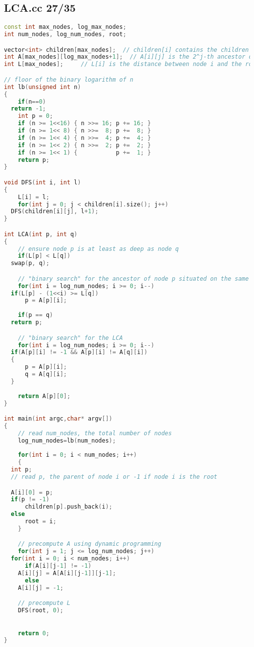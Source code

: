 \subsection{LCA.cc 27/35}
\begin{lstlisting}[language=C++]
const int max_nodes, log_max_nodes;
int num_nodes, log_num_nodes, root;

vector<int> children[max_nodes];  // children[i] contains the children of node i
int A[max_nodes][log_max_nodes+1];  // A[i][j] is the 2^j-th ancestor of node i, or -1 if that ancestor does not exist
int L[max_nodes];     // L[i] is the distance between node i and the root

// floor of the binary logarithm of n
int lb(unsigned int n)
{
    if(n==0)
  return -1;
    int p = 0;
    if (n >= 1<<16) { n >>= 16; p += 16; }
    if (n >= 1<< 8) { n >>=  8; p +=  8; }
    if (n >= 1<< 4) { n >>=  4; p +=  4; }
    if (n >= 1<< 2) { n >>=  2; p +=  2; }
    if (n >= 1<< 1) {           p +=  1; }
    return p;
}

void DFS(int i, int l)
{
    L[i] = l;
    for(int j = 0; j < children[i].size(); j++)
  DFS(children[i][j], l+1);
}

int LCA(int p, int q)
{
    // ensure node p is at least as deep as node q
    if(L[p] < L[q])
  swap(p, q);

    // "binary search" for the ancestor of node p situated on the same level as q
    for(int i = log_num_nodes; i >= 0; i--)
  if(L[p] - (1<<i) >= L[q])
      p = A[p][i];
    
    if(p == q)
  return p;

    // "binary search" for the LCA
    for(int i = log_num_nodes; i >= 0; i--)
  if(A[p][i] != -1 && A[p][i] != A[q][i])
  {
      p = A[p][i];
      q = A[q][i];
  }
    
    return A[p][0];
}

int main(int argc,char* argv[])
{
    // read num_nodes, the total number of nodes
    log_num_nodes=lb(num_nodes);
    
    for(int i = 0; i < num_nodes; i++)
    {
  int p;
  // read p, the parent of node i or -1 if node i is the root

  A[i][0] = p;
  if(p != -1)
      children[p].push_back(i);
  else
      root = i;
    }

    // precompute A using dynamic programming
    for(int j = 1; j <= log_num_nodes; j++)
  for(int i = 0; i < num_nodes; i++)
      if(A[i][j-1] != -1)
    A[i][j] = A[A[i][j-1]][j-1];
      else
    A[i][j] = -1;

    // precompute L
    DFS(root, 0);

    
    return 0;
}

\end{lstlisting}
